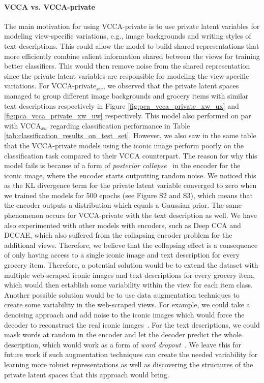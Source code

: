 \paragraph{VCCA vs. VCCA-private} The main motivation for using VCCA-private is to use private latent variables for modeling view-specific variations, e.g., image backgrounds and writing styles of text descriptions. This could allow the model to build shared representations that more efficiently combine salient information shared between the views for training better classifiers. This would then remove noise from the shared representation since the private latent variables are responsible for modeling the view-specific variations. For VCCA-private$_{x w}$, we observed that the private latent spaces managed to group different image backgrounds and grocery items with similar text descriptions respectively in Figure \ref{fig:pca_vcca_private_xw_ux} and \ref{fig:pca_vcca_private_xw_uw} respectively. This model also performed on par with VCCA$_{x w}$ regarding classification performance in Table \ref{tab:classification_results_on_test_set}. However, we also saw in the same table that the VCCA-private models using the iconic image perform poorly on the classification task compared to their VCCA counterpart. The reason for why this model fails is because of a form of \textit{posterior collapse}~ in the encoder for the iconic image, where the encoder starts outputting random noise. We noticed this as the KL divergence term for the private latent variable converged to zero when we trained the models for 500 epochs (see Figure S2 and S3), which means that the encoder outputs a distribution which equals a Gaussian prior. The same phenomenon occurs for VCCA-private with the text description as well. We have also experimented with other models with encoders, such as Deep CCA and DCCAE, which also suffered from the collapsing encoder problem for the additional views. Therefore, we believe that the collapsing effect is a consequence of only having access to a single iconic image and text description for every grocery item. Therefore, a potential solution would be to extend the dataset with multiple web-scraped iconic images and text descriptions for every grocery item, which would then establish some variability within the view for each item class. Another possible solution would be to use data augmentation techniques to create some variability in the web-scraped views. For example, we could take a denoising approach and add noise to the iconic images which would force the decoder to reconstruct the real iconic images~. For the text descriptions, we could mask words at random in the encoder and let the decoder predict the whole description, which would work as a form of \textit{word dropout}~. We leave this for future work if such augmentation techniques can create the needed variability for learning more robust representations as well as discovering the structures of the private latent spaces that this approach would bring. 

